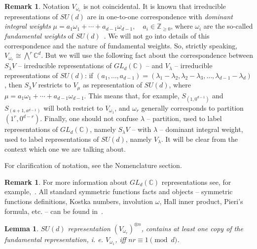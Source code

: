 \documentclass[10pt,twocolumn,superscriptaddress,aps,amsmath,amssymb,citeautoscript,floatfix,prx]{revtex4-2}
\theoremstyle{plain}
\theoremstyle{plain}
\theoremstyle{plain}
\theoremstyle{plain}
\theoremstyle{plain}
\theoremstyle{plain}
\theoremstyle{plain}
\newtheorem{smlemma}[smtheorem]{Lemma}
\theoremstyle{definition}
\newtheorem{smremark}[smtheorem]{Remark}
\theoremstyle{plain}
\begin{document}
\begin{appendix}
\begin{smremark}\label{rem:fundamental_weights}
    Notation $V_{\omega_r}$ is not coincidental. It is known that irreducible representations of $SU(d)$ are in one-to-one correspondence with \textit{dominant integral weights} $\mu=a_1 \omega_1+\cdots+a_{d-1} \omega_{d-1}, \quad a_i \in \mathbb{Z}_{\geq 0}$,
    where $\omega_i$ are the so-called \textit{fundamental weights} of $SU(d)$~\cite{Hall2015}.
    We will not go into details of this correspondence and the nature of fundamental weights. So, strictly speaking, $V_{\omega_r}\cong \bigwedge^r \mathbb C^d$.  
    But we will use the following fact about the correspondence between $S_\lambda V$ -- irreducible representations of $GL_d(\mathbb{C})$ -- and $V_\lambda$ -- irreducible representations of $SU(d)$:
    if $\left(a_1, \ldots, a_{d-1}\right)=\left(\lambda_1-\lambda_2, \lambda_2-\lambda_3, \ldots, \lambda_{d-1}-\lambda_d\right)$, then $S_\lambda V$ restricts to $V_\mu$ as representation of $SU(d)$, where $\mu=a_1 \omega_1+\cdots+a_{d-1} \omega_{d-1}$.
    This means that, for example, $S_{(1, 0^{d-1})}$ and $S_{(a+1, a^{d-1})}$ will both restrict to $V_{\omega_1}$, and $\omega_r$ generally corresponds to partition $(1^r, 0^{d-r})$.
    Finally, one should not confuse $\lambda$ -- partition, used to label representations of $GL_d(\mathbb{C})$, namely $S_\lambda V$ -- with $\lambda$ -- dominant integral weight, used to label representations of $SU(d)$, namely $V_\lambda$. It will be clear from the context which one we are talking about.
\end{smremark}

For clarification of notation, see the Nomenclature section.

\begin{smremark}
    For more information about $GL_d(\mathbb{C})$ representations see, for example,~\cite{FultonHarris1991}.
    All standard symmetric functions facts and objects -- symmetric functions definitions, Kostka numbers, involution $\omega$, Hall inner product, Pieri's formula, etc. -- can be found in~\cite{Macdonald1995}.
\end{smremark}

\begin{smlemma}\label{lem:fundamental_in_extirior_power}
    $SU(d)$ representation $\left(V_{\omega_r}\right)^{\otimes n}$, contains 
    at least one copy of the fundamental representation, i. e. $V_{\omega_1}$, iff $nr\equiv 1 \pmod{d}$.
\end{smlemma}


\end{appendix}
\end{document}
